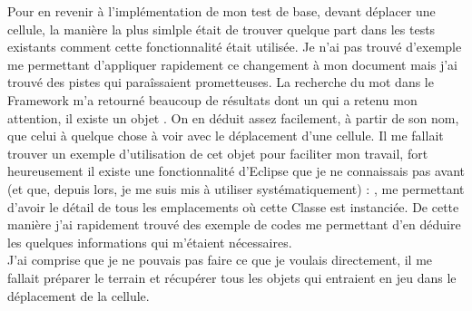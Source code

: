 Pour en revenir \`{a} l'impl\'{e}mentation de mon test de base, devant d\'{e}placer une cellule, la mani\`{e}re la plus simlple \'{e}tait de trouver quelque part dans les tests existants comment cette fonctionnalit\'{e} \'{e}tait utilis\'{e}e. Je n'ai pas trouv\'{e} d'exemple me permettant d'appliquer rapidement ce changement \`{a} mon document mais j'ai trouv\'{e} des pistes qui para\^{i}ssaient prometteuses. La recherche du mot  dans le \gls{Framework} m'a retourn\'{e} beaucoup de r\'{e}sultats dont un qui a retenu mon attention, il existe un objet . On en d\'{e}duit assez facilement, \`{a} partir de son nom, que celui \`{a} quelque chose \`{a} voir avec le d\'{e}placement d'une cellule. Il me fallait trouver un exemple d'utilisation de cet objet pour faciliter mon travail, fort heureusement il existe une fonctionnalit\'{e} d'\gls{Eclipse} que je ne connaissais pas avant (et que, depuis lors, je me suis mis \`{a} utiliser syst\'{e}matiquement) : , me permettant d'avoir le d\'{e}tail de tous les emplacements o\`{u} cette \gls{Classe} est instanci\'{e}e. De cette mani\`{e}re j'ai rapidement trouv\'{e} des exemple de codes me permettant d'en d\'{e}duire les quelques informations qui m'\'{e}taient n\'{e}cessaires.\\

J'ai comprise que je ne pouvais pas faire ce que je voulais directement, il me fallait pr\'{e}parer le terrain et r\'{e}cup\'{e}rer tous les objets qui entraient en jeu dans le d\'{e}placement de la cellule.\\

